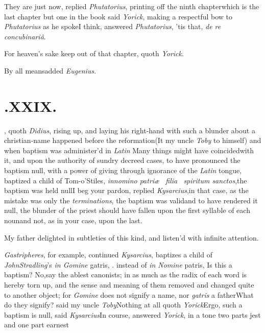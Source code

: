 \documentclass[twoside]{article}
\begin{document}
They are just now, replied \textit{Phutatorius}, printing off the
ninth chapter\tsk which is the last chapter but one in the
book\tsk{} said
\textit{Yorick}, making a respectful bow to \textit{Phutatorius} as he
spoke\tsk I think, answered \textit{Phutatorius},
’tis that, \textit{de re concubinariâ}.

For heaven’s sake keep out of that chapter, quoth
\textit{Yorick}.

\tsh By all means\tsk added \textit{Eugenius}.

\bigskip
\section{.\enspace XXIX.}

, quoth \textit{Didius},
rising up, and laying his right-hand with 
such a blunder about a christian-name
happened before the reformation\tsk (It 
my uncle \textit{Toby} to himself) and when\break
baptism was administer’d in
\textit{Latin}\tsh\break
{}\break
\tsk Many things might have coincided\break with it, and
upon the authority of sundry decreed cases, to have pronounced the
baptism null, with a power of giving
through ignorance of the \textit{Latin} tongue, baptized a child of
Tom-o’Stiles, \textit{in\break nomino patriæ \et\ filia \et\
spiritum sanctos},\break\tsk the baptism was held
null\tsk I beg your pardon, replied
\textit{Kysarcius},\tsk in that case, as the mistake was only
the \textit{terminations}, the baptism was valid\tsh and to
have rendered it null, the blunder of the priest should have fallen
upon the first syllable of each noun\tsh and not, as in
your case, upon the last.\tsk

My father delighted in subtleties of this kind, and
listen’d with infinite attention.

\textit{Gastripheres}, for example, continued \textit{Kysarcius},
baptizes a child of \textit{John\break Stradling}’s \textit{in Gomine}
gatris, \etc \et{\itshape c}.\catch{instead} instead of \textit{in Nomine} patris,
\etc\tsk Is this\break
a baptism? No,\tsk say the ablest cano\-nists; in as much as the radix of each word is hereby torn up,
and the sense\break
and meaning of them removed and\break
changed quite to another object; for\break
\textit{Gomine} does not signify a name, nor\break
\textit{gatris} a father\tsk What do they signify?\break
said my uncle \textit{Toby}\tsk Nothing at all\tsk\break
quoth \textit{Yorick}\tsk Ergo, such a baptism is\break
null, said \textit{Kysarcius}\tsk In course, answered\break
\textit{Yorick}, in a tone two parts jest and one\break
part earnest\tsk
\end{document}
